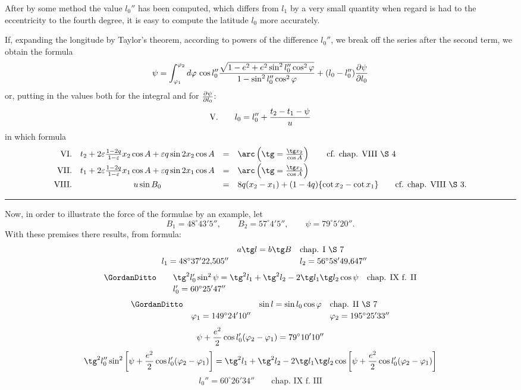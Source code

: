 \begingroup\small
After by some method the value $l_0''$ has been computed, which differs from $l_1$ by a very small quantity when regard is had to the eccentricity to the fourth degree, it is easy to compute the latitude $l_0$ more accurately.

If, expanding the longitude by Taylor's theorem, according to powers of the difference $l_0''$, we break off the series after the second term, we obtain the formula
\[
 \psi=\int_{\varphi_1}^{\varphi_2}d\varphi\,\cos l_0''{\sqrt{1-e^2+e^2\sin^2l_0''\cos^2\varphi}\over1-\sin^2l_0''\cos^2\varphi}
 +(l_0-l_0''){\partial\psi\over\partial l_0}
\]
or, putting in the values both for the integral and for ${\partial\psi\over\partial l_0}$:
\[
\text{V.}\qquad l_0=l_0''+{t_2-t_1-\psi\over u}
\]
in which formula
\[
\begin{array}{rcll}
\text{VI.}& t_2+2\varepsilon{1-2q\over1-\varepsilon}x_2\cos A+
\varepsilon q\sin2x_2\cos A&=&\arc\left(\tg={\tg x_2\over\cos A}\right) \qquad \text{cf. chap. VIII \S\ 4}\vspace{0.2em}\\
\text{VII.}& t_1+2\varepsilon{1-2q\over1-\varepsilon}x_1\cos A+
\varepsilon q\sin2x_1\cos A&=&\arc\left(\tg={\tg x_1\over\cos A}\right)\vspace{0.2em}\\
\text{VIII.}& u\sin B_0&=&8q(x_2-x_1)+(1-4q)\{\cot x_2-
\cot x_1\}\qquad \text{cf. chap. VIII \S\ 3.}
\end{array}
\]

\rule{0.35\textwidth}{0.4pt}

Now, in order to illustrate the force of the formulae by an example, let
\[
 B_1=48^\circ43'5'',\qquad B_2=57^\circ4'5'',\qquad \psi=79^\circ5'20''.
\]
With these premises there results, from formula:
\[
\begin{array}{rcll}
&& a\tg l=b\tg B & \text{chap. I \S\ 7}\vspace{0.2em}\\
& l_1=48^\circ37'22{,}505''&& l_2=56^\circ58'49{,}647''
\end{array}
\]
\[
\begin{array}{rcll}
\GordanDitto&& \tg^2l_0'\sin^2\psi=\tg^2l_1+\tg^2l_2-2\tg l_1\tg l_2\cos\psi &\text{chap. IX f. II}\vspace{0.2em}\\
&& l_0'=60^\circ25'47''&
\end{array}
\]
\[
\begin{array}{rcll}
\GordanDitto&& \sin l=\sin l_0\cos\varphi &\text{chap. II \S\ 7}\vspace{0.2em}\\
& \varphi_1=149^\circ24'10''&& \varphi_2=195^\circ25'33''
\end{array}
\]
\[
 \psi+{e^2\over2}\cos l_0'(\varphi_2-\varphi_1)=79^\circ10'10''
\]
\[
\tg^2l_0''\sin^2\left[\psi+{e^2\over2}\cos l_0'(\varphi_2-\varphi_1)\right]
=\tg^2l_1+\tg^2l_2-2\tg l_1\tg l_2\cos\left[\psi+{e^2\over2}\cos l_0'(\varphi_2-\varphi_1)\right]
\]
\[
 l_0''=60^\circ26'34'' \qquad\text{chap. IX f. III}
\]
\endgroup
